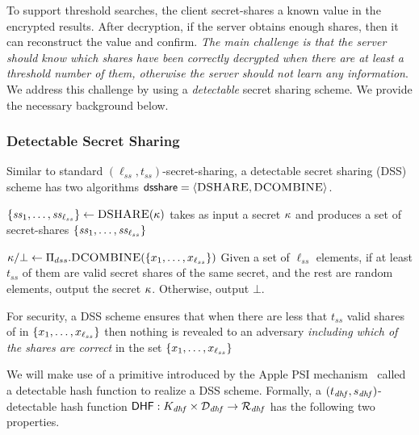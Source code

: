 To support threshold searches, the client secret-shares a known value in the encrypted results. After decryption, if the server obtains enough shares, then it can reconstruct the value and confirm. \emph{The main challenge is that the server should know which shares have been correctly decrypted when there are at least a threshold number of them, otherwise  the server should not learn any information}. We address this challenge by using a \emph{detectable} secret sharing scheme. We provide the necessary background below. 

\newcommand{\secretShareThreshold}{\ensuremath{t_{ss}}\xspace}
\newcommand{\secretShareLength}{\ensuremath{\ell_{ss}}\xspace}
\newcommand{\dhfLength}{\ensuremath{\ell_{dhf}}\xspace}


\subsubsection{Detectable Secret Sharing}
%
Similar to standard $(\secretShareLength, \secretShareThreshold)$-secret-sharing, a detectable secret sharing (DSS) scheme has two algorithms $\mathsf{dsshare} = \langle \textsc{DSHARE}, \textsc{DCOMBINE}\rangle$. 

\itemListStart
\item $\{ \secretShare{1},\dots, \secretShare{\secretShareLength} \} \gets \DSShare(\genericSymmKey)$ takes as input a secret $\kappa$ and produces a set of secret-shares $\{ \secretShare{1},\dots, \secretShare{\secretShareLength} \}$
\item $\genericSymmKey/\bot \gets \dssProtocol.\DSCombine(\{\genericSetElmt[1], \dots, \genericSetElmt[\secretShareLength] \})$ Given a set of $\secretShareLength$ elements, if at least \secretShareThreshold of them are valid secret shares of the same secret, and the rest are random elements, output the secret $\kappa$. Otherwise, output $\bot$. 
\itemListEnd

For security, a DSS scheme ensures that when there are less that \secretShareThreshold valid shares of \genericSymmKey in $\{\genericSetElmt[1], \dots, \genericSetElmt[\secretShareLength] \}$ then nothing is revealed to an adversary \emph{including which of the shares are correct} in the set $\{\genericSetElmt[1], \dots, \genericSetElmt[\secretShareLength] \}$



%
We will make use of a primitive introduced by the Apple PSI mechanism~\cite{pinkas2021applepsi} called a detectable hash 
function to realize a DSS scheme. Formally, a $(t_{\mathit{dhf}}, s_{\mathit{dhf}})$-detectable 
hash function $\dhf: \dhfKeySpace \times \dhfDomain \rightarrow \dhfRange$ has the following 
two properties.

